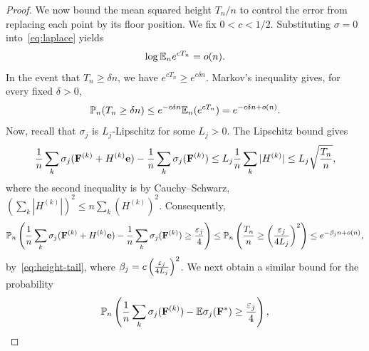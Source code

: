 \documentclass[11pt,letterpaper]{article}
\begin{document}
\begin{proof}
      We now bound the mean squared height $T_n/n$ to control the error from replacing each point by its floor position. We fix $0<c<1/2$. Substituting $\sigma=0$ into~\eqref{eq:laplace} yields
      \[
            \log\mathbb E_n e^{cT_n}=o(n).
      \]
      In the event that $T_n\ge\delta n$, we have $e^{cT_n}\ge e^{c\delta n}$. Markov's inequality gives, for every fixed $\delta>0$,
      \begin{equation}\label{eq:height-tail}
            \mathbb P_n(T_n\ge\delta n)\le e^{-c\delta n}\mathbb E_n(e^{c T_n})= e^{-c\delta n+o(n)}.
      \end{equation}
      Now, recall that $\sigma_{j}$ is $L_{j}$-Lipschitz for some $L_{j}>0$.
      The Lipschitz bound gives
      \[\frac{1}{n}\sum_{k}\sigma_{j}(\mathbf F^{(k)}+H^{(k)}\mathbf e)- \frac{1}{n}\sum_{k}\sigma_{j}(\mathbf F^{(k)})\leq L_{j}\frac{1}{n}\sum_{k}|H^{(k)}|\leq L_{j}\sqrt{\frac{T_n}{n}},\]
      where the second inequality is by Cauchy--Schwarz, $(\sum_k|H^{(k)}|)^2\le n\sum_k(H^{(k)})^2$. Consequently,
      \begin{equation}\label{eq:heights_neligible}\mathbb P_n\left(\frac{1}{n}\sum_{k}\sigma_{j}(\mathbf F^{(k)}+H^{(k)}\mathbf e)- \frac{1}{n}\sum_{k}\sigma_{j}(\mathbf F^{(k)})\geq\frac{\varepsilon_{j}}{4}\right)\leq \mathbb P_n\left(\frac{T_n}{n}\geq\left(\frac{\varepsilon_{j}}{4 L_{j}}\right)^{2}\right)\le e^{-\beta_{j}n+o(n)},\end{equation}
      by~\eqref{eq:height-tail}, where $\beta_{j}=c\left(\frac{\varepsilon_{j}}{4 L_{j}}\right)^{2}$. We next obtain a similar bound for the probability
      \[\mathbb P_n\left(\frac{1}{n}\sum_{k} \sigma_{j}(\mathbf F^{(k)})-\mathbb E \sigma_{j}(\mathbf F^\ast)\geq\frac{\varepsilon_{j}}{4}\right),\]

\end{proof}
\end{document}
